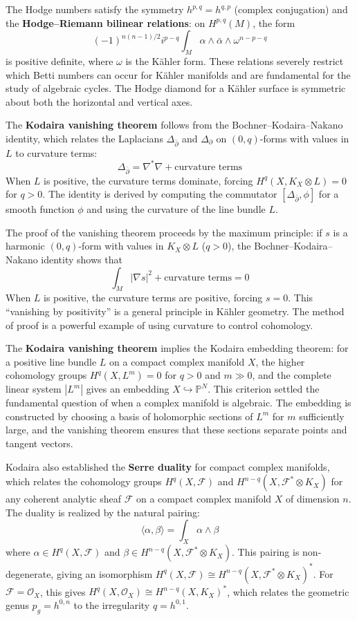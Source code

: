 The Hodge numbers satisfy the symmetry $h^{p,q} = h^{q,p}$ (complex
conjugation) and the \textbf{Hodge--Riemann bilinear relations}: on
$H^{p,q}(M)$, the form
\[(-1)^{n(n-1)/2} i^{p-q} \int_M \alpha \wedge \bar{\alpha} \wedge
\omega^{n-p-q}\]
is positive definite, where $\omega$ is the K{\"a}hler form. These
relations severely restrict which Betti numbers can occur for K{\"a}hler
manifolds and are fundamental for the study of algebraic cycles. The
Hodge diamond for a K{\"a}hler surface is symmetric about both the
horizontal and vertical axes.

The \textbf{Kodaira vanishing theorem} \cite{kodaira1964} follows from the
Bochner--Kodaira--Nakano identity, which relates the Laplacians
$\Delta_{\bar{\partial}}$ and $\Delta_{\partial}$ on $(0,q)$-forms with
values in $L$ to curvature terms:
\[\Delta_{\bar{\partial}} = \nabla^* \nabla + \text{curvature terms}\]
When $L$ is positive, the curvature terms dominate, forcing $H^q(X,
K_X \otimes L) = 0$ for $q > 0$. The identity is derived by computing
the commutator $[\Delta_{\bar{\partial}}, \phi]$ for a smooth function
$\phi$ and using the curvature of the line bundle $L$.

The proof of the vanishing theorem proceeds by the maximum principle:
if $s$ is a harmonic $(0,q)$-form with values in $K_X \otimes L$ ($q >
0$), the Bochner--Kodaira--Nakano identity shows that
\[\int_M |\nabla s|^2 + \text{curvature terms} = 0\]
When $L$ is positive, the curvature terms are positive, forcing $s = 0$.
This ``vanishing by positivity'' is a general principle in K{\"a}hler
geometry. The method of proof is a powerful example of using curvature
to control cohomology.

The \textbf{Kodaira vanishing theorem} \cite{kodaira1964} implies the Kodaira embedding
theorem: for a positive line bundle $L$ on a compact complex manifold
$X$, the higher cohomology groups $H^q(X, L^m) = 0$ for $q > 0$ and
$m \gg 0$, and the complete linear system $|L^m|$ gives an embedding
$X \hookrightarrow \mathbb{P}^N$. This criterion settled the
fundamental question of when a complex manifold is algebraic. The
embedding is constructed by choosing a basis of holomorphic sections of
$L^m$ for $m$ sufficiently large, and the vanishing theorem ensures
that these sections separate points and tangent vectors.

Kodaira also established the \textbf{Serre duality} for compact
complex manifolds, which relates the cohomology groups $H^q(X,
\mathcal{F})$ and $H^{n-q}(X, \mathcal{F}^* \otimes K_X)$ for any
coherent analytic sheaf $\mathcal{F}$ on a compact complex manifold $X$
of dimension $n$. The duality is realized by the natural pairing:
\[\langle \alpha, \beta \rangle = \int_X \alpha \wedge \beta\]
where $\alpha \in H^q(X, \mathcal{F})$ and $\beta \in H^{n-q}(X,
\mathcal{F}^* \otimes K_X)$. This pairing is non-degenerate, giving an
isomorphism $H^q(X, \mathcal{F}) \cong H^{n-q}(X, \mathcal{F}^*
\otimes K_X)^*$. For $\mathcal{F} = \mathcal{O}_X$, this gives
$H^q(X, \mathcal{O}_X) \cong H^{n-q}(X, K_X)^*$, which relates the
geometric genus $p_g = h^{0,n}$ to the irregularity $q = h^{0,1}$.

